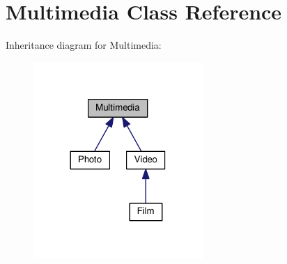 \hypertarget{classMultimedia}{\section{Multimedia Class Reference}
\label{classMultimedia}
}


Inheritance diagram for Multimedia\+:
\nopagebreak
\begin{figure}[H]
\begin{center}
\leavevmode
\includegraphics[width=182pt]{classMultimedia__inherit__graph}
\end{center}
\end{figure}
